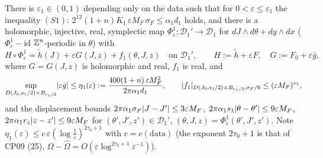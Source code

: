 \begin{proposition}\label{bpP:p11:avg-fast}
There is $\varepsilon_1\in(0,1)$ depending only on the data such that for $0<\varepsilon\le\varepsilon_1$ the inequality $(S1)$: $2^{12}(1+n)K_1\,\varepsilon M_F\,\sigma_F\le\alpha_1d_1$ holds, and there is a holomorphic, injective, real, symplectic map $\Phi^1_\varepsilon:\mathcal D_1'\to\mathcal D_1$ for $dJ\wedge d\theta+dy\wedge dx$ ($\Phi^1_\varepsilon-\mathrm{id}$ $\mathbb{Z}^n$-periodic in $\theta$) with
\[H\circ\Phi^1_\varepsilon=\tilde h(J)+\varepsilon G(J,z)+f_1(\theta,J,z)\quad\text{on }\mathcal D_1',\qquad H:=\tilde h+\varepsilon F,\quad G:=F_0+\varepsilon\bar g,\]
where $G=G(J,z)$ is holomorphic and real, $f_1$ is real, and
\[\sup_{D(J_0,s_1/2)\times B_{r_z/2}}\lvert \varepsilon\bar g\rvert\le\eta_1(\varepsilon):=\frac{400(1+n)\,\varepsilon M_F^2}{2\pi\alpha_1d_1},\qquad\lvert f_1\rvert_{D(J_0,s_1/2)\times B_{r_z/2},\sigma_F/6}\le(\varepsilon M_F)^{\nu_1},\]
and the displacement bounds $2\pi\alpha_1\sigma_F\lvert J-J'\rvert\le3\varepsilon M_F$, $2\pi\alpha_1s_1\lvert \theta-\theta'\rvert\le9\varepsilon M_F$, $2\pi\alpha_1r_z\lvert z-z'\rvert\le9\varepsilon M_F$ for $(\theta',J',z')\in\mathcal D_1'$, $(\theta,J,z)=\Phi^1_\varepsilon(\theta',J',z')$. Note $\eta_1(\varepsilon)\le c\,\varepsilon(\log\frac1\varepsilon)^{2\tau_0+1}$ with $c=c(\mathrm{data})$ (the exponent $2\tau_0+1$ is that of CP09 (25), $\Omega-\hat\Omega=O(\varepsilon\log^{2\tau_0+1}\varepsilon^{-1})$).
\end{proposition}
